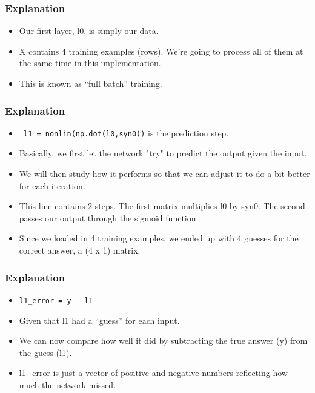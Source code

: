 \begin{frame}[fragile] \frametitle{Explanation}

\begin{itemize}
\item Our first layer, l0, is simply our data.
\item X contains 4 training examples (rows). We're going to process all of them at the same time in this implementation. 
\item This is known as ``full batch'' training. 
\end{itemize}
\end{frame}

\begin{frame}[fragile] \frametitle{Explanation}

\begin{itemize}
\item \lstinline| l1 = nonlin(np.dot(l0,syn0))| is the prediction step.
\item Basically, we first let the network "try" to predict the output given the input. 
\item We will then study how it performs so that we can adjust it to do a bit better for each iteration. 
\item This line contains 2 steps. The first matrix multiplies l0 by syn0. The second passes our output through the sigmoid function.
\item Since we loaded in 4 training examples, we ended up with 4 guesses for the correct answer, a (4 x 1) matrix.
\end{itemize}
\end{frame}


\begin{frame}[fragile] \frametitle{Explanation}

\begin{itemize}
\item \lstinline|l1_error = y - l1| 
\item Given that l1 had a ``guess'' for each input. 
\item We can now compare how well it did by subtracting the true answer (y) from the guess (l1).
\item  l1\_error is just a vector of positive and negative numbers reflecting how much the network missed. 
\end{itemize}
\end{frame}

